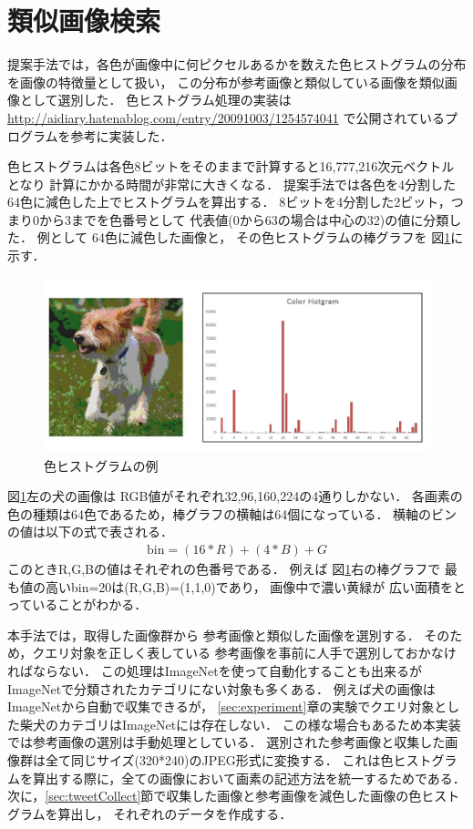 \section{類似画像検索}
\label{sec:similar}
提案手法では，各色が画像中に何ピクセルあるかを数えた色ヒストグラムの分布を画像の特徴量として扱い，
この分布が参考画像と類似している画像を類似画像として選別した．
色ヒストグラム処理の実装は
\url{http://aidiary.hatenablog.com/entry/20091003/1254574041}
で公開されているプログラムを参考に実装した．

色ヒストグラムは各色8ビットをそのままで計算すると16,777,216次元ベクトルとなり
計算にかかる時間が非常に大きくなる．
提案手法では各色を4分割した64色に減色した上でヒストグラムを算出する．
8ビットを4分割した2ビット，つまり0から3までを色番号として
代表値(0から63の場合は中心の32)の値に分類した．
例として
64色に減色した画像と，
その色ヒストグラムの棒グラフを
図\ref{fig:color}に示す．
%
\begin{figure}[tb]
 \begin{center}
  \includegraphics[scale=0.50]{colorhist.jpg}
 \end{center}
 \caption{色ヒストグラムの例}
 \label{fig:color}
\end{figure}
%
%
図\ref{fig:color}左の犬の画像は
RGB値がそれぞれ32,96,160,224の4通りしかない．
各画素の色の種類は64色であるため，棒グラフの横軸は64個になっている．
横軸のビンの値は以下の式で表される．
\begin{eqnarray}
\mbox{bin} = (16 * R) + (4 * B) + G
\end{eqnarray}
このときR,G,Bの値はそれぞれの色番号である．
例えば
図\ref{fig:color}右の棒グラフで
最も値の高いbin=20は(R,G,B)=(1,1,0)であり，
画像中で濃い黄緑が
広い面積をとっていることがわかる．

本手法では，取得した画像群から
参考画像と類似した画像を選別する．
そのため，クエリ対象を正しく表している
参考画像を事前に人手で選別しておかなければならない．
この処理はImageNetを使って自動化することも出来るが
ImageNetで分類されたカテゴリにない対象も多くある．
例えば犬の画像はImageNetから自動で収集できるが，
\ref{sec:experiment}章の実験でクエリ対象とした柴犬のカテゴリはImageNetには存在しない．
この様な場合もあるため本実装では参考画像の選別は手動処理としている．
%
選別された参考画像と収集した画像群は全て同じサイズ(320*240)のJPEG形式に変換する．
これは色ヒストグラムを算出する際に，全ての画像において画素の記述方法を統一するためである．
次に，\ref{sec:tweetCollect}節で収集した画像と参考画像を減色した画像の色ヒストグラムを算出し，
それぞれのデータを作成する．

